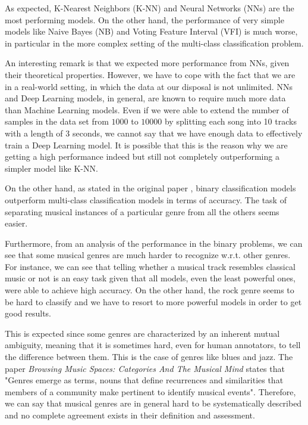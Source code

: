 \documentclass{Configuration_Files/PoliMi3i_thesis}
\begin{document}
As expected, K-Nearest Neighbors (K-NN) and Neural Networks (NNs) are the most performing models. On the other hand, the performance of very simple models like Naive Bayes (NB) and Voting Feature Interval (VFI) is much worse, in particular in the more complex setting of the multi-class classification problem.

An interesting remark is that we expected more performance from NNs, given their theoretical properties. However, we have to cope with the fact that we are in a real-world setting, in which the data at our disposal is not unlimited. NNs and Deep Learning models, in general, are known to require much more data than Machine Learning models. Even if we were able to extend the number of samples in the data set from $1000$ to $10000$ by splitting each song into 10 tracks with a length of 3 seconds, we cannot say that we have enough data to effectively train a Deep Learning model. It is possible that this is the reason why we are getting a high performance indeed but still not completely outperforming a simpler model like K-NN.

On the other hand, as stated in the original paper \cite{original-paper}, binary classification models outperform multi-class classification models in terms of accuracy. The task of separating musical instances of a particular genre from all the others  seems easier.

Furthermore, from an analysis of the performance in the binary problems, we can see that some musical genres are much harder to recognize w.r.t. other genres. For instance, we can see that telling whether a musical track resembles classical music or not is an easy task given that all models, even the least powerful ones, were able to achieve high accuracy. On the other hand, the rock genre seems to be hard to classify and we have to resort to more powerful models in order to get good results. 

This is expected since some genres are characterized by an inherent mutual ambiguity, meaning that it is sometimes hard, even for human annotators, to tell the difference between them. This is the case of genres like blues and jazz. The paper \textit{Browsing Music Spaces: Categories And The Musical Mind} \cite{music-paper}  states that "Genres emerge as terms, nouns that define recurrences and similarities that members of a community make pertinent to identify musical events". Therefore, we can say that musical genres are in general hard to be systematically described and no complete agreement exists in their definition and assessment. 
\end{document}

